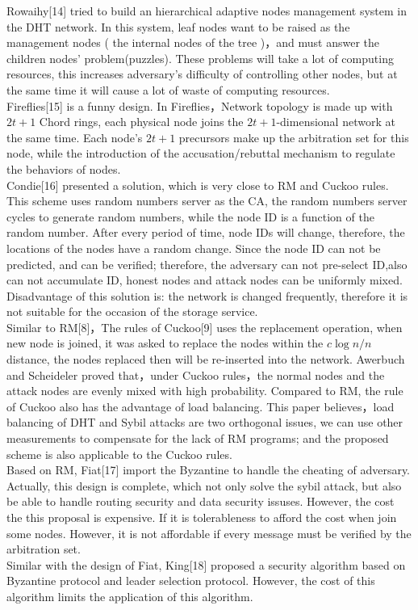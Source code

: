 \documentclass[10pt]{article}
\begin{document}
Rowaihy[14] tried to build an hierarchical adaptive nodes management system in the DHT network. In this system,  leaf nodes want to be raised as the management nodes ( the internal nodes of the tree )，and must answer the children nodes' problem(puzzles). These problems will take a lot of computing resources, this increases adversary's difficulty of controlling other nodes, but at the same time it will cause a lot of waste of computing resources. \\
Fireflies[15] is a funny design. In Fireflies，Network topology is made up with \(2t+1\) Chord rings, each physical node joins the  \(2t+1\)-dimensional network at the same time. Each node's \(2t+1\) precursors make up the arbitration set for this node, while the introduction of the accusation/rebuttal mechanism to regulate the behaviors of nodes.\\
Condie[16] presented a solution, which is very close to RM and Cuckoo rules. This scheme uses random numbers server as the CA, the random numbers server cycles to generate random numbers, while the node ID is a function of the random number.  After every period of time, node IDs will change, therefore, the locations of the nodes have a random change. Since the node ID can not be predicted, and can be verified; therefore, the adversary can not pre-select ID,also can not accumulate ID, honest nodes and attack nodes can be uniformly mixed. Disadvantage of this solution is: the network is changed frequently, therefore it is not suitable for the occasion of the storage service.\\
Similar to RM[8]，The rules of Cuckoo[9] uses the replacement operation, when new node is joined, it was asked to replace the nodes within the \(c\log{n}/n\) distance, the nodes replaced then will be re-inserted into the network.  Awerbuch and Scheideler proved that，under Cuckoo rules，the normal nodes and the attack nodes are evenly mixed with high probability. Compared to RM, the rule of Cuckoo also has the advantage of load balancing. This paper believes，load balancing of DHT and Sybil attacks are two orthogonal issues, we can use other measurements to compensate for the lack of RM programs; and the proposed scheme is also applicable to the Cuckoo rules.\\
Based on RM, Fiat[17] import the Byzantine to handle the cheating of adversary. Actually, this design is complete, which not only solve the sybil attack, but also be able to handle routing security and data security issuses. However, the cost the this proposal is expensive. If it is tolerableness to afford the cost when join some nodes. However, it is not affordable if every message must be verified by the arbitration set. \\
Similar with the design of Fiat, King[18] proposed a security algorithm based on Byzantine protocol and leader selection protocol. However, the cost of this algorithm limits the application of this algorithm.
\end{document}
